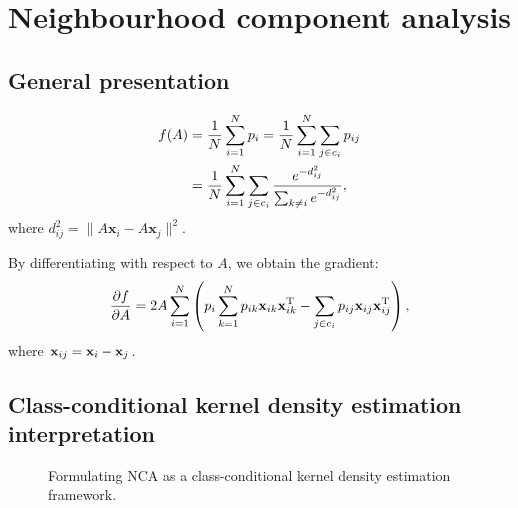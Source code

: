 \chapter{Neighbourhood component analysis}
\label{ch:nca}

\section{General presentation}
\label{sec:general-presentation}

\begin{align}
 f(A) &= \frac{1}{N}\sum_{i=1}^Np_i=\frac{1}{N}\sum_{i=1}^N\sum_{j\in c_i}p_{ij}\notag\\
 &= \frac{1}{N}\sum_{i=1}^N\sum_{j\in c_i}\frac{e^{-d_{ij}^2}}{\sum_{k\neq i}e^{-d_{ij}^2}}\label{eq:nca-obj},
\end{align}
 where $d_{ij}^2=\lVert A\mathbf{x}_i-A\mathbf{x}_j\lVert^2$.

By differentiating with respect to $A$, we obtain the gradient:
\begin{align}
  \frac{\partial f}{\partial A}=2A\sum_{i=1}^{N}\left(p_i\sum_{k=1}^Np_{ik}\mathbf{x}_{ik}\mathbf{x}_{ik}^{\textrm{T}} - \sum_{j\in c_i}p_{ij}\mathbf{x}_{ij}\mathbf{x}_{ij}^{\textrm{T}} \right)\label{eq:nca-grad},
\end{align}
where $\mathbf{x}_{ij} = \mathbf{x}_i - \mathbf{x}_j$. 

\section{Class-conditional kernel density estimation interpretation}
\label{sec:cc-kde}

\begin{figure}
  \centering
  \caption{Formulating NCA as a class-conditional kernel density estimation framework.}
  \label{fig:kde}
\end{figure}

